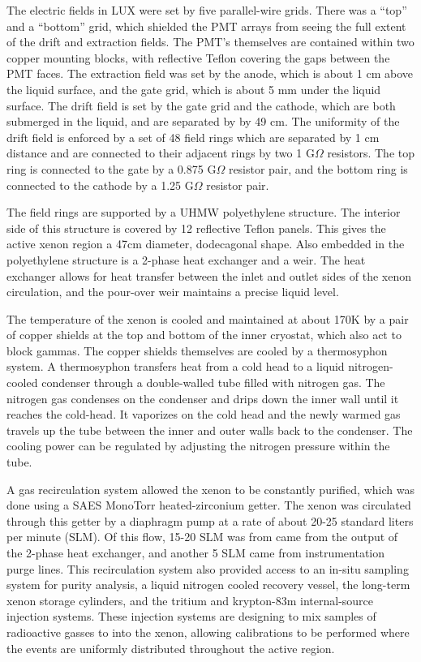 The electric fields in LUX were set by five parallel-wire grids. There was a ``top'' and a ``bottom'' grid, which shielded the PMT arrays from seeing the full extent of the drift and extraction fields. The PMT's themselves are contained within two copper mounting blocks, with reflective Teflon covering the gaps between the PMT faces. The extraction field was set by the anode, which is about 1 cm above the liquid surface, and the gate grid, which is about 5 mm under the liquid surface. The drift field is set by the gate grid and the cathode, which are both submerged in the liquid, and are separated by by 49 cm. The uniformity of the drift field is enforced by a set of 48 field rings which are separated by 1 cm distance and are connected to their adjacent rings by two 1 G$\Omega$ resistors. The top ring is connected to the gate by a 0.875 G$\Omega$ resistor pair, and the bottom ring is connected to the cathode by a 1.25 G$\Omega$ resistor pair.

The field rings are supported by a UHMW polyethylene structure. The interior side of this structure is covered by 12 reflective Teflon panels. This gives the active xenon region a 47cm diameter, dodecagonal shape. Also embedded in the polyethylene structure is a 2-phase heat exchanger and a weir. The heat exchanger allows for heat transfer between the inlet and outlet sides of the xenon circulation, and the pour-over weir maintains a precise liquid level.

The temperature of the xenon is cooled and maintained at about 170K by a pair of copper shields at the top and bottom of the inner cryostat, which also act to block gammas. The copper shields themselves are cooled by a thermosyphon system\cite{thermosyphon}. A thermosyphon transfers heat from a cold head to a liquid nitrogen-cooled condenser through a double-walled tube filled with nitrogen gas. The nitrogen gas condenses on the condenser and drips down the inner wall until it reaches the cold-head. It vaporizes on the cold head and the newly warmed gas travels up the tube between the inner and outer walls back to the condenser. The cooling power can be regulated by adjusting the nitrogen pressure within the tube.

A gas recirculation system allowed the xenon to be constantly purified, which was done using a SAES
MonoTorr heated-zirconium getter\cite{getter}. The xenon was circulated through this getter by a diaphragm pump at a rate of about 20-25 standard liters per minute (SLM). Of this flow, 15-20 SLM was from came from the output of the 2-phase heat exchanger, and another 5 SLM came from instrumentation purge lines. This recirculation system also provided access to an in-situ sampling system for purity analysis, a liquid nitrogen cooled recovery vessel, the long-term xenon storage cylinders, and the tritium\cite{lux_tritium} and krypton-83m\cite{lux_kr1} internal-source injection systems. These injection systems are designing to mix samples of radioactive gasses to into the xenon, allowing calibrations to be performed where the events are uniformly distributed throughout the active region.

